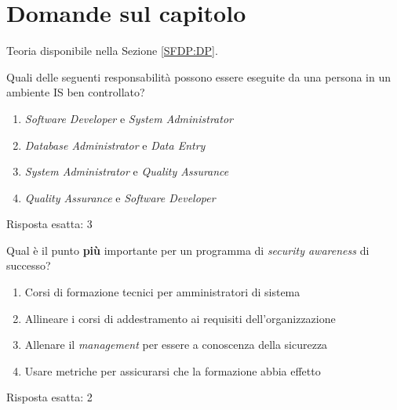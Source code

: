 \section{Domande sul capitolo}
\label{esSFDP:generali}

Teoria disponibile nella Sezione \ref{SFDP:DP}.


\begin{Exercise} [
  title={Quiz},
  label={esSFDP5}
  ]

  \Question Quali delle seguenti responsabilità possono essere eseguite da una 
persona in un ambiente IS ben controllato?
\begin{enumerate}
 \item \textit{Software Developer} e \textit{System Administrator}
 \item \textit{Database Administrator} e \textit{Data Entry}
 \item \textit{System Administrator} e \textit{Quality Assurance}
 \item \textit{Quality Assurance} e \textit{Software Developer}
\end{enumerate}
  
\end{Exercise}


\begin{Answer} [
  ref={esSFDP5},
  number={5}
  ]

  \Question Risposta esatta: 3
\end{Answer}


\begin{Exercise} [
  title={Quiz},
  label={esSFDP6}
  ]

  \Question Qual è il punto \textbf{più} importante per un programma di 
\textit{security awareness} di successo?
\begin{enumerate}
 \item Corsi di formazione tecnici per amministratori di sistema
 \item Allineare i corsi di addestramento ai requisiti dell'organizzazione
 \item Allenare il \textit{management} per essere a conoscenza della sicurezza
 \item Usare metriche per assicurarsi che la formazione abbia effetto
\end{enumerate}
  
\end{Exercise}


\begin{Answer} [
  ref={esSFDP6},
  number={6}
  ]

  \Question Risposta esatta: 2
\end{Answer}


